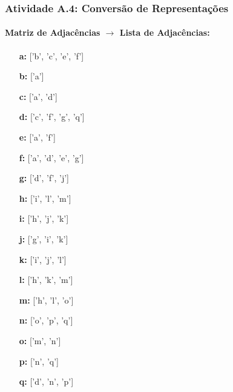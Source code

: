 \documentclass[a4paper,12pt]{article}
\begin{document}
\subsubsection*{Atividade A.4: Conversão de Representações}
\paragraph*{Matriz de Adjacências $\rightarrow$ Lista de Adjacências:}
\begin{itemize}[leftmargin=*]
    \item[\textbf{a:}] ['b', 'c', 'e', 'f'] \item[\textbf{b:}] ['a'] \item[\textbf{c:}] ['a', 'd'] \item[\textbf{d:}] ['c', 'f', 'g', 'q']
    \item[\textbf{e:}] ['a', 'f'] \item[\textbf{f:}] ['a', 'd', 'e', 'g'] \item[\textbf{g:}] ['d', 'f', 'j']
    \item[\textbf{h:}] ['i', 'l', 'm'] \item[\textbf{i:}] ['h', 'j', 'k'] \item[\textbf{j:}] ['g', 'i', 'k']
    \item[\textbf{k:}] ['i', 'j', 'l'] \item[\textbf{l:}] ['h', 'k', 'm'] \item[\textbf{m:}] ['h', 'l', 'o']
    \item[\textbf{n:}] ['o', 'p', 'q'] \item[\textbf{o:}] ['m', 'n'] \item[\textbf{p:}] ['n', 'q'] \item[\textbf{q:}] ['d', 'n', 'p']
\end{itemize}
\end{document}

